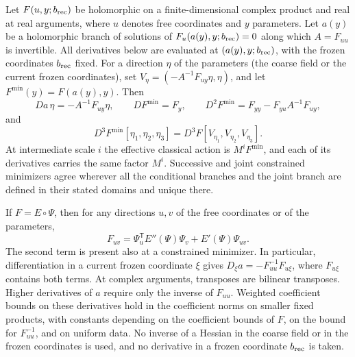 \begin{lemma}\label{ch15:lem:minimum-calculus}
Let $F(u,y;b_{\mathrm{rec}})$ be holomorphic on a finite-dimensional complex product and real at real arguments, where $u$ denotes free coordinates and $y$ parameters. Let $a(y)$ be a holomorphic branch of solutions of $F_u(a(y),y;b_{\mathrm{rec}})=0$ along which $A=F_{uu}$ is invertible. All derivatives below are evaluated at $(a(y),y;b_{\mathrm{rec}})$, with the frozen coordinates $b_{\mathrm{rec}}$ fixed. For a direction $\eta$ of the parameters (the coarse field or the current frozen coordinates), set $V_\eta=(-A^{-1}F_{uy}\eta,\eta)$, and let $F^{\min}(y)=F(a(y),y)$. Then
\[
 Da\,\eta=-A^{-1}F_{uy}\eta,\qquad
 DF^{\min}=F_y,\qquad
 D^2F^{\min}=F_{yy}-F_{yu}A^{-1}F_{uy},
\]
and
\[
 D^3F^{\min}[\eta_1,\eta_2,\eta_3]
           =D^3F[V_{\eta_1},V_{\eta_2},V_{\eta_3}].
\]
At intermediate scale $i$ the effective classical action is $M^iF^{\min}$, and each of its derivatives carries the same factor $M^i$. Successive and joint constrained minimizers agree wherever all the conditional branches and the joint branch are defined in their stated domains and unique there.

If $F=E\circ\Psi$, then for any directions $u,v$ of the free coordinates or of the parameters,
\[
 F_{uv}=\Psi_u^{\mathsf T}E''(\Psi)\Psi_v
                             +E'(\Psi)\Psi_{uv}.
\]
The second term is present also at a constrained minimizer. In particular, differentiation in a current frozen coordinate $\xi$ gives $D_\xi a=-F_{uu}^{-1}F_{u\xi}$, where $F_{u\xi}$ contains both terms. At complex arguments, transposes are bilinear transposes. Higher derivatives of $a$ require only the inverse of $F_{uu}$. Weighted coefficient bounds on these derivatives hold in the coefficient norms on smaller fixed products, with constants depending on the coefficient bounds of $F$, on the bound for $F_{uu}^{-1}$, and on uniform data. No inverse of a Hessian in the coarse field or in the frozen coordinates is used, and no derivative in a frozen coordinate $b_{\mathrm{rec}}$ is taken.
\end{lemma}

